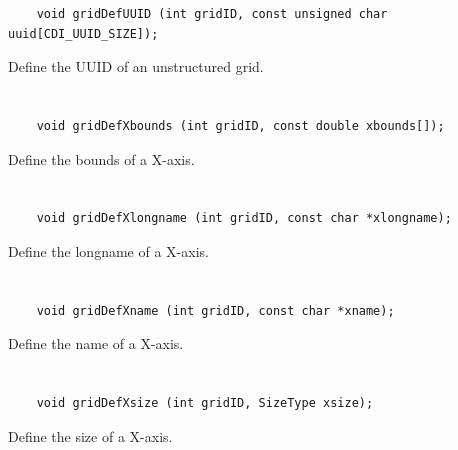 \begin{verbatim}
    void gridDefUUID (int gridID, const unsigned char uuid[CDI_UUID_SIZE]);
\end{verbatim}

Define the UUID of an unstructured grid.


\section*{\tt {}}

\begin{verbatim}
    void gridDefXbounds (int gridID, const double xbounds[]);
\end{verbatim}

Define the bounds of a X-axis.


\section*{\tt {}}

\begin{verbatim}
    void gridDefXlongname (int gridID, const char *xlongname);
\end{verbatim}

Define the longname of a X-axis.


\section*{\tt {}}

\begin{verbatim}
    void gridDefXname (int gridID, const char *xname);
\end{verbatim}

Define the name of a X-axis.


\section*{\tt {}}

\begin{verbatim}
    void gridDefXsize (int gridID, SizeType xsize);
\end{verbatim}

Define the size of a X-axis.


\section*{\tt {}}

